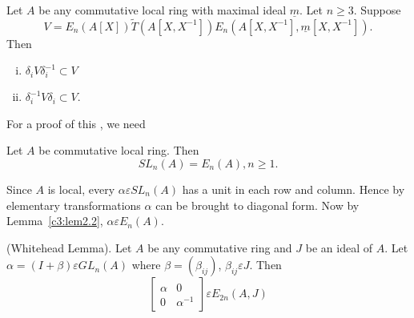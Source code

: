 \begin{Prop}\label{c3:Prop3.2}
Let $A$ be any commutative local ring with maximal ideal
$\underline{m}$. Let $n\geq 3$. Suppose
$$
V=E_n(A[X])\tilde{T}\left(A\left[X,X^{-1}\right]\right)E_n\left(A\left[X,X^{-1}\right],\underline{m}\left[X,X^{-1}\right]\right).
$$
Then 
\begin{enumerate}[(i)]
\item $\delta_iV\delta^{-1}_i\subset V$

\item $\delta^{-1}_iV\delta_i\subset V$.
\end{enumerate}

For a proof of this , we need
\end{Prop}

\begin{lem}\label{c3:lem3.3}
Let $A$ be commutative local ring. Then
$$
SL_n(A)=E_n(A),n\geq 1.
$$
\end{lem}

\begin{Proof}
Since $A$ is local, every $\alpha \varepsilon SL_n(A)$ has a unit in
each row and column. Hence by elementary transformations $\alpha$ can
be brought to diagonal form. Now by Lemma~\ref{c3:lem2.2}, $\alpha
\varepsilon E_n(A)$.
\enprf
\end{Proof}

\begin{lem}\label{c3:lem3.4}
(Whitehead Lemma). Let $A$ be any commutative ring and $J$ be an ideal
  of $A$. Let $\alpha=(I+\beta)\varepsilon GL_n(A)$ where
  $\beta=(\beta_{ij})$, $\beta_{ij}\varepsilon J$. Then 
$$
\begin{bmatrix}
\alpha & 0\\
0 & \alpha^{-1}
\end{bmatrix} \varepsilon E_{2n}(A,J)
$$
\end{lem}


